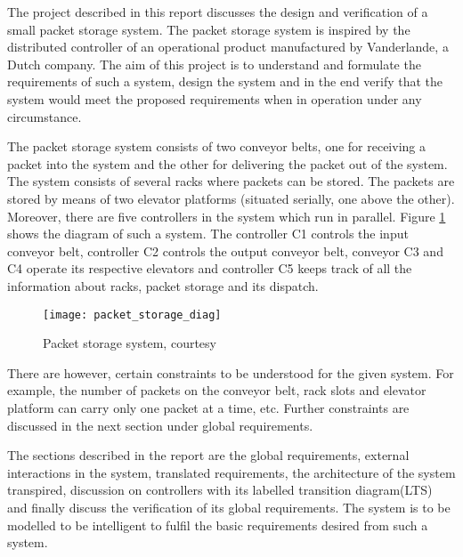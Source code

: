 
The project described in this report discusses the design and verification of a small packet storage system. The packet storage system is inspired by the distributed controller of an operational product manufactured by Vanderlande, a Dutch company. 
The aim of this project is to understand and formulate the requirements of such a system, design the system and in the end verify that the system would meet the proposed requirements when in operation under any circumstance.

The packet storage system consists of two conveyor belts, one for receiving a packet into the system and the other for delivering the packet out of the system. The system consists of several racks where packets can be stored. The packets are stored by means of two elevator platforms (situated serially, one above the other). Moreover, there are five controllers in the system which run in parallel. Figure \ref{fig:packet_storage} shows the diagram of such a system. The controller C1 controls the input conveyor belt, controller C2 controls the output conveyor belt, conveyor C3 and C4 operate its respective elevators and controller C5 keeps track of all the information about racks, packet storage and its dispatch.

\begin{figure}[h]
\center
\texttt{[image: packet\_storage\_diag]}
\caption{Packet storage system, courtesy \cite{problem_statement}}
\label{fig:packet_storage}
\end{figure}

There are however, certain constraints to be understood for the given system. For example, the number of packets on the conveyor belt, rack slots and elevator platform can carry only one packet at a time, etc. Further constraints are discussed in the next section under global requirements.

The sections described in the report are the global requirements, external interactions in the system, translated requirements, the architecture of the system transpired, discussion on controllers with its labelled transition diagram(LTS) and finally discuss the verification of its global requirements.
The system is to be modelled to be intelligent to fulfil the basic requirements desired from such a system.